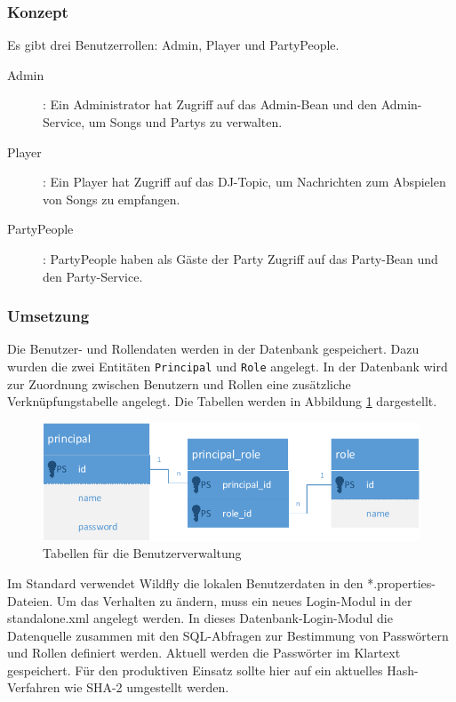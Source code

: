\subsubsection{Konzept}
Es gibt drei Benutzerrollen: Admin, Player und PartyPeople.
\begin{description}
	\item[Admin]: Ein Administrator hat Zugriff auf das Admin-Bean und den Admin-Service, um Songs und Partys zu verwalten.
	\item[Player]: Ein Player hat Zugriff auf das DJ-Topic, um Nachrichten zum Abspielen von Songs zu empfangen.
	\item[PartyPeople]: PartyPeople haben als Gäste der Party Zugriff auf das Party-Bean und den Party-Service.
\end{description}

\subsubsection{Umsetzung}
Die Benutzer- und Rollendaten werden in der Datenbank gespeichert. Dazu wurden die zwei Entitäten \texttt{Principal} und \texttt{Role} angelegt. In der Datenbank wird zur Zuordnung zwischen Benutzern und Rollen eine zusätzliche Verknüpfungstabelle angelegt. Die Tabellen werden in Abbildung \ref{fig:BenutzerRollen} dargestellt.

\begin{figure}[tbh]
\centering
\includegraphics[width=1.0\linewidth]{Bilder/BenutzerRollen}
\caption{Tabellen für die Benutzerverwaltung}
\label{fig:BenutzerRollen}
\end{figure}

Im Standard verwendet Wildfly die lokalen Benutzerdaten in den *.properties-Dateien. Um das Verhalten zu ändern, muss ein neues Login-Modul in der standalone.xml angelegt werden. In dieses Datenbank-Login-Modul die Datenquelle zusammen mit den SQL-Abfragen zur Bestimmung von Passwörtern und Rollen definiert werden. Aktuell werden die Passwörter im Klartext gespeichert. Für den produktiven Einsatz sollte hier auf ein aktuelles Hash-Verfahren wie SHA-2 umgestellt werden.


